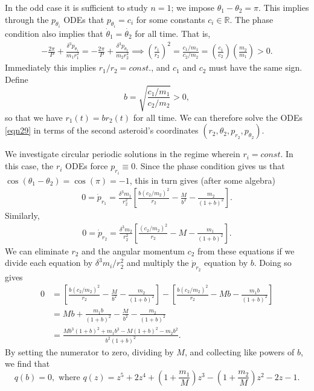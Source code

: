 \documentclass[12pt]{article}
\newcommand{\Real}{\mathbb{R}}
\begin{document}
In the odd case it is sufficient to study $n = 1$; we impose $\theta_1 - \theta_2 = \pi$. This implies through the $p_{\theta_i}$ ODEs that $p_{\theta_i} = c_i$ for some constants $c_i \in \Real$. The phase condition also implies that $\dot{\theta}_1 = \dot{\theta_2}$ for all time. That is,
\begin{align*}
-\frac{2\pi}{P} + \frac{\delta^3p_{\theta_1}}{m_1r_1^2} = -\frac{2\pi}{P} + \frac{\delta^3p_{\theta_2}}{m_2r_2^2} 
\implies \left(\frac{r_1}{r_2}\right)^2 = \frac{c_1/m_1}{c_2/m_2} = \left(\frac{c_1}{c_2}\right)\left(\frac{m_2}{m_1}\right) > 0.
\end{align*}
Immediately this implies $r_1/r_2 = const.$, and $c_1$ and $c_2$ must have the same sign. Define
\begin{equation}
    b = \sqrt{\frac{c_1/m_1}{c_2/m_2}} > 0,
    \label{eqn30}
\end{equation}
so that we have $r_1(t) = br_2(t)$ for all time. We can therefore solve the ODEs \eqref{eqn29} in terms of the second asteroid's coordinates $(r_2,\theta_2,p_{r_2},p_{\theta_2})$.

We investigate circular periodic solutions in the regime wherein $r_i = const$. In this case, the $r_i$ ODEs force $p_{r_i} \equiv 0$. Since the phase condition gives us that $\cos(\theta_1 - \theta_2) = \cos(\pi) = -1$, this in turn gives (after some algebra)
\begin{align*}
0 = \dot{p}_{r_1} = \frac{\delta^3m_1}{r_2^2}\left[\frac{b(c_2/m_2)^2}{r_2} - \frac{M}{b^2} - \frac{m_2}{(1+b)^2}\right].
\end{align*}
Similarly, 
\begin{align*}
0 = \dot{p}_{r_2} = \frac{\delta^3m_2}{r_2^2}\left[\frac{(c_2/m_2)^2}{r_2} - M - \frac{m_1}{(1+b)^2}\right].
\end{align*}
We can eliminate $r_2$ and the angular momentum $c_2$ from these equations if we divide each equation by $\delta^3m_i/r_2^2$ and multiply the $\dot{p}_{r_2}$ equation by $b$. Doing so gives
\begin{align*}
0 & = \left[\frac{b(c_2/m_2)^2}{r_2} - \frac{M}{b^2} - \frac{m_2}{(1+b)^2}\right] -  \left[\frac{b(c_2/m_2)^2}{r_2} - Mb - \frac{m_1b}{(1+b)^2}\right]\\
& = Mb + \frac{m_1b}{(1+b)^2} - \frac{M}{b^2} - \frac{m_2}{(1+b)^2} \\
& = \frac{Mb^3(1+b)^2 + m_1b^3 - M(1+b)^2 - m_2b^2}{b^2(1+b)^2}.
\end{align*}
By setting the numerator to zero, dividing by $M$, and collecting like powers of $b$, we find that
\begin{equation}
q(b) = 0, \text{ where } q(z) = z^5 + 2z^4 + \left(1 + \frac{m_1}{M}\right)z^3 - \left(1 + \frac{m_2}{M}\right)z^2 - 2z - 1.
\label{eqn31}
\end{equation}
\end{document}
